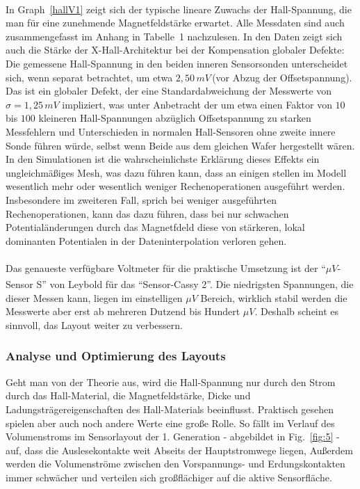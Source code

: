 \documentclass[12pt, a4paper]{article}
\begin{document}
\paragraph{}
In Graph~\ref*{hallV1} zeigt sich der typische lineare Zuwachs der Hall-Spannung, die man für eine zunehmende Magnetfeldstärke erwartet.\newline 
Alle Messdaten sind auch zusammengefasst im Anhang in Tabelle~1 nachzulesen.\newline
In den Daten zeigt sich auch die Stärke der X-Hall-Architektur bei der Kompensation globaler Defekte: Die gemessene Hall-Spannung in den beiden inneren Sensorsonden unterscheidet sich, wenn separat betrachtet, um etwa $2,50\,mV$\,(vor Abzug der Offsetspannung). Das ist ein globaler Defekt, der eine Standardabweichung der Messwerte von $\sigma=1,25\,mV$ impliziert, was unter Anbetracht der um etwa einen Faktor von $10$ bis $100$ kleineren Hall-Spannungen abzüglich Offsetspannung zu starken Messfehlern und Unterschieden in normalen Hall-Sensoren ohne zweite innere Sonde führen würde, selbst wenn Beide aus dem gleichen Wafer hergestellt wären.\newline
In den Simulationen ist die wahrscheinlichste Erklärung dieses Effekts ein ungleichmäßiges Mesh, was dazu führen kann, dass an einigen stellen im Modell wesentlich mehr oder wesentlich weniger Rechenoperationen ausgeführt werden. Insbesondere im zweiteren Fall, sprich bei weniger ausgeführten Rechenoperationen, kann das dazu führen, dass bei nur schwachen Potentialänderungen durch das Magnetfdeld diese von stärkeren, lokal dominanten Potentialen in der Dateninterpolation verloren gehen.\paragraph{} 
Das genaueste verfügbare Voltmeter für die praktische Umsetzung ist der ``$\mu{V}$-Sensor S'' von Leybold\textsuperscript{\textregistered} für das ``Sensor-Cassy 2''. Die niedrigsten Spannungen, die dieser Messen kann, liegen im einstelligen $\mu{V}$ Bereich, wirklich stabil werden die Messwerte aber erst ab mehreren Dutzend bis Hundert $\mu{V}$.\newline
Deshalb scheint es sinnvoll, das Layout weiter zu verbessern.

\subsubsection{Analyse und Optimierung des Layouts}
Geht man von der Theorie aus, wird die Hall-Spannung nur durch den Strom durch das Hall-Material, die Magnetfeldstärke, Dicke und Ladungsträgereigenschaften des Hall-Materials beeinflusst. Praktisch gesehen spielen aber auch noch andere Werte eine große Rolle. \newline
So fällt im Verlauf des Volumenstroms im Sensorlayout der 1. Generation - abgebildet in Fig.~\ref{fig:5} - auf, dass die Auslesekontakte weit Abseits der Hauptstromwege liegen, Außerdem werden die Volumenströme zwischen den Vorspannungs- und Erdungskontakten immer schwächer und verteilen sich großflächiger auf die aktive Sensorfläche.
\end{document}
